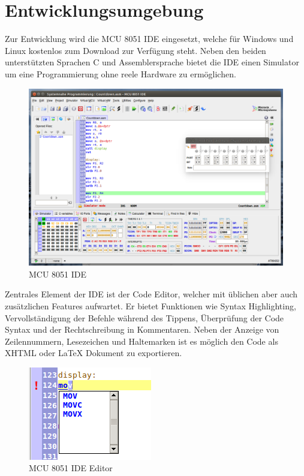 
\chapter{Entwicklungsumgebung}\label{entwicklungsumgebung}

Zur Entwicklung wird die MCU 8051 \ac{IDE} eingesetzt, welche für Windows und Linux kostenlos zum
Download zur Verfügung steht. Neben den beiden unterstützten Sprachen C und Assemblersprache bietet
die \ac{IDE} einen Simulator um eine Programmierung ohne reele Hardware zu ermöglichen.

\begin{figure}[htbp]
\centering
\includegraphics{images/ide.png}
\caption{MCU 8051 IDE}
\end{figure}

Zentrales Element der \ac{IDE} ist der Code Editor, welcher mit üblichen aber auch zusätzlichen
Features aufwartet. Er bietet Funktionen wie Syntax Highlighting, Vervollständigung der Befehle
während des Tippens, Überprüfung der Code Syntax und der Rechtschreibung in Kommentaren. Neben der
Anzeige von Zeilennummern, Lesezeichen und Haltemarken ist es möglich den Code als XHTML oder LaTeX
Dokument zu exportieren.

\begin{figure}[htbp]
\centering
\includegraphics{images/editor.png}
\caption{MCU 8051 IDE Editor}
\end{figure}

